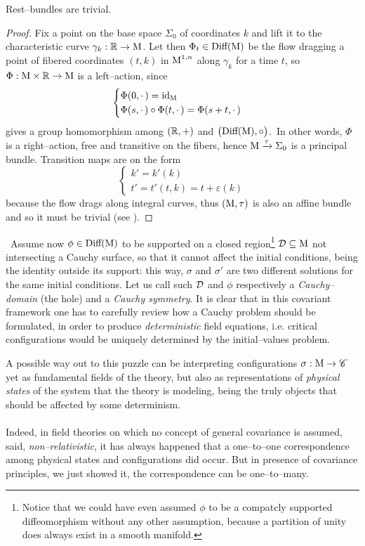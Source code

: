 \begin{prop}
    Rest--bundles are trivial.
\end{prop}
\begin{proof}
    Fix a point on the base space $\Sigma_0$ of coordinates $k$ and lift it to the characteristic curve $\gamma_k:\mathbb{R}\to\text{\normalfont M}$. Let then $\Phi_t\in\text{\normalfont Diff}(\text{\normalfont M})$ be the flow dragging a point of fibered coordinates $(t,k)$ in $\text{\normalfont M}^{1,n}$ along $\gamma_k$ for a time $t$, so $\Phi:\text{\normalfont M}\times\mathbb{R}\to\text{\normalfont M}$ is a left--action, since
    $$\begin{cases}
        \Phi(0,\cdot\,)=\text{\normalfont id}_{\text{\normalfont M}}\\
        \Phi(s,\cdot\,)\circ\Phi(t,\cdot\,)=\Phi(s+t,\cdot\,)
    \end{cases}$$
    gives a group homomorphism among $(\mathbb{R},+)$ and $\big(\text{\normalfont Diff}(\text{\normalfont M}),\circ\big)$.\, In other words, $\Phi$ is a right--action, free and transitive on the fibers, hence $\text{\normalfont M}\xrightarrow{\tau}\Sigma_0$ is a principal bundle. Transition maps are on the form
    $$\begin{cases}
        k'=k'(k)\\
        t'=t'(t,k)=t+\varepsilon(k)
    \end{cases}$$
    because the flow drags along integral curves, thus $(\text{\normalfont M},\tau)$ is also an affine bundle and so it must be trivial (see \cite{husemoller}).

\end{proof}
\,\newline
Assume now $\phi\in\text{\normalfont Diff}(\text{\normalfont M})$ to be supported on a closed region\footnote{Notice that we could have even assumed $\phi$ to be a compatcly supported diffeomorphism without any other assumption, because a partition of unity does always exist in a smooth manifold.} $\mathcal{D}\subseteq\text{\normalfont M}$ not intersecting a Cauchy surface, so that it cannot affect the initial conditions, being the identity outside its support: this way, $\sigma$ and $\sigma'$ are two different solutions for the same initial conditions. Let us call such $\mathcal{D}$ and $\phi$ respectively a \emph{Cauchy--domain} (the hole) and a \emph{Cauchy symmetry}. It is clear that in this covariant framework one has to carefully review how a Cauchy problem should be formulated, in order to produce \emph{deterministic} field equations, i.e. critical configurations would be uniquely determined by the initial--values problem.

A possible way out to this puzzle can be interpreting configurations $\sigma:\text{\normalfont M}\to\mathscr{C}$ yet as fundamental fields of the theory, but also as representations of \emph{physical states} of the system that the theory is modeling, being the truly objects that should be affected by some determinism. \\
\\
Indeed, in field theories on which no concept of general covariance is assumed, said, \emph{non--relativistic}, it has always happened that a one--to--one correspondence among physical states and configurations did occur. But in presence of covariance principles, we just showed it, the correspondence can be one--to--many. 

